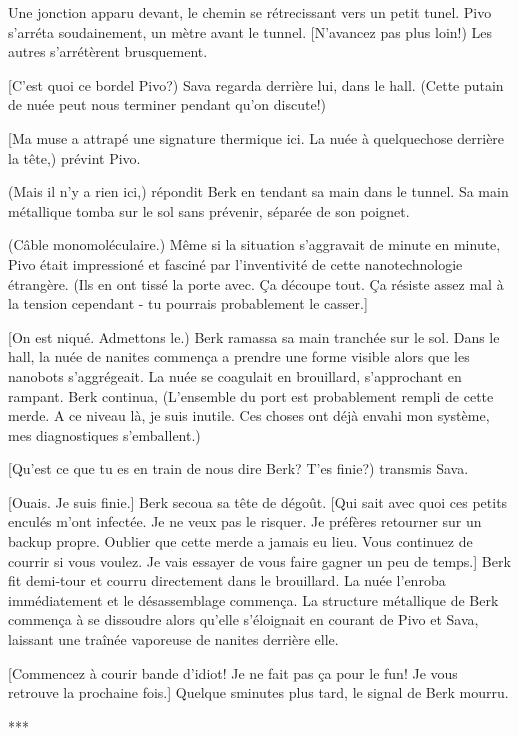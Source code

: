 Une jonction apparu devant, le chemin se rétrecissant vers un petit tunel. Pivo s'arréta soudainement, un mètre avant le tunnel. [N'avancez pas plus loin!) Les autres s'arrétèrent brusquement. 

[C'est quoi ce bordel Pivo?) Sava regarda derrière lui, dans le hall. (Cette putain de nuée peut nous terminer pendant qu'on discute!) 

[Ma muse a attrapé une signature thermique ici. La nuée à quelquechose derrière la tête,) prévint Pivo. 

(Mais il n'y a rien ici,) répondit Berk en tendant sa main dans le tunnel. Sa main métallique tomba sur le sol sans prévenir, séparée de son poignet. 

(Câble monomoléculaire.) Même si la situation s'aggravait de minute en minute, Pivo était impressioné et fasciné par l'inventivité de cette nanotechnologie étrangère. (Ils en ont tissé la porte avec. Ça découpe tout. Ça résiste assez mal à la tension cependant - tu pourrais probablement le casser.] 

[On est niqué. Admettons le.) Berk ramassa sa main tranchée sur le sol. Dans le hall, la nuée de nanites commença a prendre une forme visible alors que les nanobots s'aggrégeait. La nuée se coagulait en brouillard, s'approchant en rampant. Berk continua, (L'ensemble du port est probablement rempli de cette merde. A ce niveau là, je suis inutile. Ces choses ont déjà envahi mon système, mes diagnostiques s'emballent.) 

[Qu'est ce que tu es en train de nous dire Berk? T'es finie?) transmis Sava. 

[Ouais. Je suis finie.] Berk secoua sa tête de dégoût. [Qui sait avec quoi ces petits enculés  m'ont infectée. Je ne veux pas le risquer. Je préfères retourner sur un backup propre. Oublier que cette merde a jamais eu lieu. Vous continuez de courrir si vous voulez. Je vais essayer de vous faire gagner un peu de temps.] Berk fit demi-tour et courru directement dans le brouillard. La nuée l'enroba immédiatement et le désassemblage commença. La structure métallique de Berk commença à se dissoudre alors qu'elle s'éloignait en courant de Pivo et Sava, laissant une traînée vaporeuse de nanites derrière elle. 

[Commencez à courir bande d'idiot! Je ne fait pas ça pour le fun! Je vous retrouve la prochaine fois.] Quelque sminutes plus tard, le signal de Berk mourru. 

\begin{center} *** \end{center} 

